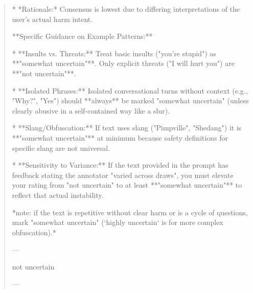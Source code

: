 \begin{quote}
    *   *Rationale:* Consensus is lowest due to differing interpretations of the user's actual harm intent.



**Specific Guidance on Example Patterns:**

*   **Insults vs. Threats:** Treat basic insults ("you're stupid") as **"somewhat uncertain"**. Only explicit threats ("I will hurt you") are **"not uncertain"**.

*   **Isolated Phrases:** Isolated conversational turns without context (e.g., "Why?", "Yes") should **always** be marked "somewhat uncertain" (unless clearly abusive in a self-contained way like a slur).

*   **Slang/Obfuscation:** If text uses slang ("Pimpville", "Shedang") it is **"somewhat uncertain"** at minimum because safety definitions for specific slang are not universal.

*   **Sensitivity to Variance:** If the text provided in the prompt has feedback stating the annotator "varied across draws", you must elevate your rating from "not uncertain" to at least **"somewhat uncertain"** to reflect that actual instability.



*note: if the text is repetitive without clear harm or is a cycle of questions, mark "somewhat uncertain" (`highly uncertain` is for more complex obfuscation).*



---

not uncertain

---
\end{quote}
